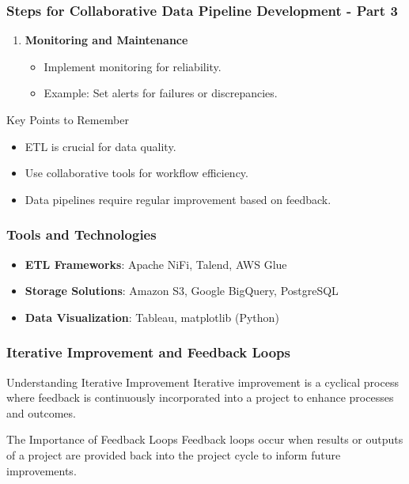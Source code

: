 \documentclass{beamer}
\begin{document}
\begin{frame}[fragile]
    \frametitle{Steps for Collaborative Data Pipeline Development - Part 3}
    \begin{enumerate}[resume]
        \item \textbf{Monitoring and Maintenance}
        \begin{itemize}
            \item Implement monitoring for reliability.
            \item Example: Set alerts for failures or discrepancies.
        \end{itemize}
    \end{enumerate}

    \begin{block}{Key Points to Remember}
        \begin{itemize}
            \item ETL is crucial for data quality.
            \item Use collaborative tools for workflow efficiency.
            \item Data pipelines require regular improvement based on feedback.
        \end{itemize}
    \end{block}
\end{frame}

\begin{frame}[fragile]
    \frametitle{Tools and Technologies}
    \begin{itemize}
        \item \textbf{ETL Frameworks}: Apache NiFi, Talend, AWS Glue
        \item \textbf{Storage Solutions}: Amazon S3, Google BigQuery, PostgreSQL
        \item \textbf{Data Visualization}: Tableau, matplotlib (Python)
    \end{itemize}
\end{frame}

\begin{frame}[fragile]
    \frametitle{Iterative Improvement and Feedback Loops}
    
    \begin{block}{Understanding Iterative Improvement}
        Iterative improvement is a cyclical process where feedback is continuously incorporated into a project to enhance processes and outcomes. 
    \end{block}

    \begin{block}{The Importance of Feedback Loops}
        Feedback loops occur when results or outputs of a project are provided back into the project cycle to inform future improvements.
    \end{block}
\end{frame}
\end{document}
